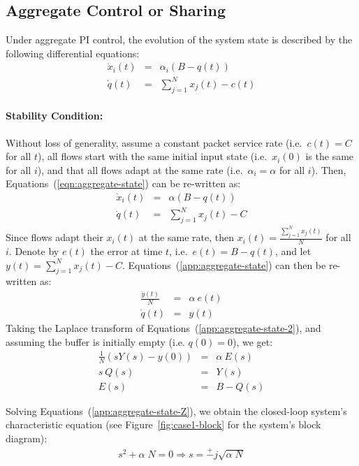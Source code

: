 \documentclass{article}
\begin{document}
\subsection{Aggregate Control or Sharing}
\label{sec:aggregate-control}

Under aggregate PI control,
the evolution of the system state is described by the following
differential equations:
\begin{eqnarray}
\dot{x}_i(t) &=& \alpha_i (B-q(t)) \nonumber \\ 
\dot{q}(t) &=& \sum_{j=1}^{N} x_j(t) - c(t) 
\label{eqn:aggregate-state}
\end{eqnarray}


\paragraph{Stability Condition:}
Without loss of generality,
assume a constant packet service rate
(i.e.\ $c(t) = C$ for all $t$),
all flows start with the same initial input state
(i.e.\ $x_i(0)$ is the same for all $i$),
and that all flows adapt at the same rate
(i.e.\ $\alpha_i = \alpha$ for all $i$).
Then, Equations~(\ref{eqn:aggregate-state}) can be re-written as:
\begin{eqnarray}
\dot{x}_i(t) &=& \alpha (B-q(t))  \nonumber \\ 
\dot{q}(t) &=& \sum_{j=1}^{N} x_j(t) - C 
\label{app:aggregate-state}
\end{eqnarray}
Since flows adapt their $x_i(t)$ at the same rate,
then $x_i(t) = \frac{\sum_{j=1}^{N} x_j(t)}{N}$ for all $i$.
Denote by $e(t)$ the error at time $t$,
i.e.\ $e(t) = B-q(t)$,
and let $y(t) =  \sum_{j=1}^{N} x_j(t) - C$.
Equations~(\ref{app:aggregate-state}) can then be re-written as:
\begin{eqnarray}
\frac{\dot{y}(t)}{N} &=& \alpha\ e(t)  \nonumber \\ 
\dot{q}(t) &=& y(t)
\label{app:aggregate-state-2}
\end{eqnarray}
Taking the Laplace transform 
of Equations~(\ref{app:aggregate-state-2}), 
and assuming the buffer is initially empty (i.e. $q(0)=0$),
we get:
\begin{eqnarray}
\frac{1}{N} (s Y(s) - y(0))  &=& \alpha\ E(s)  \nonumber \\ 
s\ Q(s) &=& Y(s) \nonumber \\
E(s) &=& B - Q(s) 
\label{app:aggregate-state-Z}
\end{eqnarray}

Solving Equations~(\ref{app:aggregate-state-Z}), we obtain the closed-loop system's characteristic equation
(see Figure~\ref{fig:case1-block} for the system's block diagram):
\begin{eqnarray}
s^2 + \alpha\; N = 0 \Rightarrow s = \stackrel{+}{-} j \sqrt{\alpha\; N}
\label{eqn:poles-aggr}
\end{eqnarray}
\end{document}
